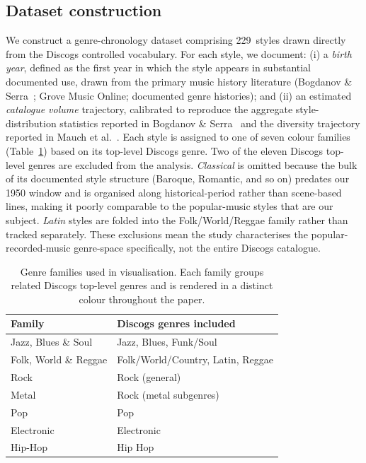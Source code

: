 \documentclass[12pt, a4paper]{article}
\newcommand{\gsNStyles}{229}%
\begin{document}
\subsection{Dataset construction}

We construct a genre-chronology dataset comprising \gsNStyles\ styles
drawn directly from the Discogs controlled vocabulary.
For each style, we document: (i) a \emph{birth year}, defined as the first
year in which the style appears in substantial documented use, drawn from
the primary music history literature (Bogdanov \& Serra~\citep{bogdanov2017quantifying};
Grove Music Online; documented genre histories); and (ii) an estimated
\emph{catalogue volume} trajectory, calibrated to reproduce the aggregate
style-distribution statistics reported in Bogdanov \&
Serra~\citep{bogdanov2017quantifying} and the diversity trajectory
reported in Mauch et al.~\citep{mauch2015evolution}.
Each style is assigned to one of seven colour families
(Table~\ref{tab:families}) based on its top-level Discogs genre.
Two of the eleven Discogs top-level genres are excluded from the analysis.
\emph{Classical} is omitted because the bulk of its documented style
structure (Baroque, Romantic, and so on) predates our 1950 window and is
organised along historical-period rather than scene-based lines, making it
poorly comparable to the popular-music styles that are our subject.
\emph{Latin} styles are folded into the Folk/World/Reggae family rather
than tracked separately. These exclusions mean the study characterises the
popular-recorded-music genre-space specifically, not the entire Discogs
catalogue.

\begin{table}[h]
\centering
\small
\caption{Genre families used in visualisation. Each family groups related
  Discogs top-level genres and is rendered in a distinct colour throughout
  the paper.}
\label{tab:families}
\begin{tabularx}{0.78\textwidth}{l X}
\toprule
\textbf{Family} & \textbf{Discogs genres included} \\
\midrule
Jazz, Blues \& Soul & Jazz, Blues, Funk/Soul \\
Folk, World \& Reggae & Folk/World/Country, Latin, Reggae \\
Rock & Rock (general) \\
Metal & Rock (metal subgenres) \\
Pop & Pop \\
Electronic & Electronic \\
Hip-Hop & Hip Hop \\
\bottomrule
\end{tabularx}
\end{table}
\end{document}
